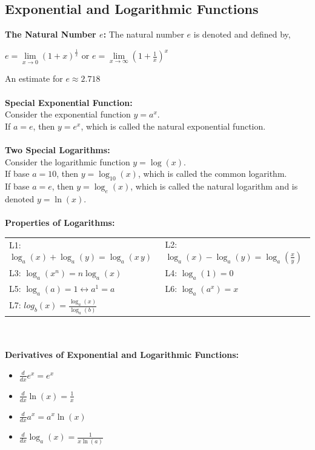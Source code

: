 \documentclass[14pt]{article}
\begin{document}
    \subsection{Exponential and Logarithmic Functions}
    \textbf{The Natural Number $e$:}
    The natural number $e$ is denoted and defined by, \\
    \begin{center}
        $e=\lim \limits_{x\rightarrow0} (1+x)^{\frac{1}{x}}$ or $e=\lim
        \limits_{x\rightarrow\infty}\left(1+\frac{1}{x}\right)^x$
    \end{center} 
    An estimate for $e\approx2.718$\\\\
    \textbf{Special Exponential Function:}\\
    Consider the exponential function $y=a^x$.\\
    If $a=e$, then $y=e^x$, which is called the natural exponential
    function.\\\\
    \textbf{Two Special Logarithms:}\\ 
    Consider the logarithmic function $y=\log(x)$.\\
    If base $a=10$, then $y=\log_10(x)$, which is called the common
    logarithm.\\
    If base $a=e$, then $y=\log_e(x)$, which is called the natural
    logarithm and is denoted $y=\ln(x)$.\\\\
    \textbf{Properties of Logarithms:}\\
    \begin{tabular}{p{5cm}p{5cm}}
        L1: $\log_a(x)+\log_a(y)=\log_a(x\,y)$ &
        L2:$\log_a(x)-\log_a(y)=\log_a\left(\frac{x}{y}\right)$\\
        L3: $\log_a\left(x^n\right)=n \log_a(x)$& L4: $\log_a(1)=0$\\
        L5: $\log_a (a)=1 \leftrightarrow a^1=a$& L6:
        $\log_a\left(a^x\right)=x$\\
        L7: $log_b(x)=\frac{\log_a(x)}{\log_a(b)}$& \end{tabular}\\\\
    \textbf{Derivatives of Exponential and Logarithmic Functions:}\\
    \begin{itemize}
        \item $\frac{d}{dx} e^x=e^x$
        \item $\frac{d}{dx} \ln(x)=\frac{1}{x}$
        \item $\frac{d}{dx} a^x=a^x\ln(x)$
        \item $\frac{d}{dx} \log_a(x)=\frac{1}{x\ln(a)}$
    \end{itemize}
\end{document}

